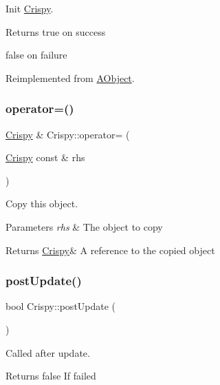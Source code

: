 Init \hyperlink{class_crispy}{Crispy}. 

\begin{DoxyReturn}{Returns}
true on success 

false on failure 
\end{DoxyReturn}


Reimplemented from \hyperlink{class_a_object_afa83ef1c900a47453524219788327b86}{A\+Object}.

\mbox{\label{class_crispy_a7b82eba5a20747f4412510ad7be548af}} 
\subsubsection{\texorpdfstring{operator=()}{operator=()}}
{\footnotesize\ttfamily \hyperlink{class_crispy}{Crispy} \& Crispy\+::operator= (\begin{DoxyParamCaption}\item[{\hyperlink{class_crispy}{Crispy} const \&}]{rhs }\end{DoxyParamCaption})}



Copy this object. 


\begin{DoxyParams}{Parameters}
{\em rhs} & The object to copy \\
\hline
\end{DoxyParams}
\begin{DoxyReturn}{Returns}
\hyperlink{class_crispy}{Crispy}\& A reference to the copied object 
\end{DoxyReturn}
\mbox{\label{class_crispy_aa83ad22c80b962ee0380c1e394ae8610}} 
\subsubsection{\texorpdfstring{post\+Update()}{postUpdate()}}
{\footnotesize\ttfamily bool Crispy\+::post\+Update (\begin{DoxyParamCaption}{ }\end{DoxyParamCaption})\hspace{0.3cm}{\ttfamily [virtual]}}



Called after update. 

\begin{DoxyReturn}{Returns}
false If failed 
\end{DoxyReturn}


